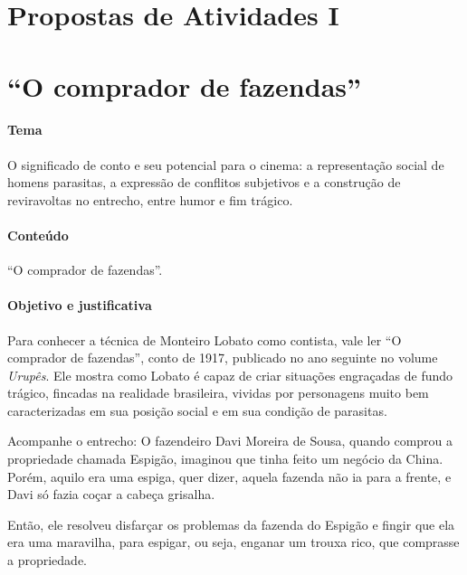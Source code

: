 \documentclass[11pt]{extarticle}
\begin{document}
\tableofcontents


\section{Propostas de Atividades I}

\section{``O comprador de fazendas''}

\paragraph{Tema} O significado de conto e seu potencial para o cinema: a representação
social de homens parasitas, a expressão de conflitos subjetivos e a
construção de reviravoltas no entrecho, entre humor e fim trágico.


\paragraph{Conteúdo} ``O comprador de fazendas''.

\paragraph{Objetivo e justificativa} Para conhecer a técnica de Monteiro Lobato 
como contista, vale ler ``O
comprador de fazendas'', conto de 1917, publicado no ano seguinte no
volume \emph{Urupês}. Ele mostra como Lobato é capaz de criar situações
engraçadas de fundo trágico, fincadas na realidade brasileira, vividas
por personagens muito bem caracterizadas em sua posição social e em sua
condição de parasitas.


Acompanhe o entrecho: O fazendeiro Davi Moreira de Sousa, quando comprou
a propriedade chamada Espigão, imaginou que tinha feito um negócio da
China. Porém, aquilo era uma espiga, quer dizer, aquela fazenda não ia
para a frente, e Davi só fazia coçar a cabeça grisalha.

Então, ele resolveu disfarçar os problemas da fazenda do Espigão e
fingir que ela era uma maravilha, para espigar, ou seja, enganar um
trouxa rico, que comprasse a propriedade.
\end{document}
